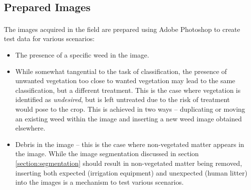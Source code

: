 \documentclass[letterpaper]{article}
\begin{document}
\subsection{Prepared Images}
The images acquired in the field are prepared using Adobe Photoshop\textsuperscript{\textregistered} to create test data for various scenarios:
\begin{itemize}
	\item{The presence of a specific weed in the image.}
	\item{While somewhat tangential to the task of classification, the presence of unwanted vegetation too close to wanted vegetation may lead to the same classification, but a different treatment. This is the case where vegetation is identified as \textit{undesired}, but is left untreated due to the risk of treatment would pose to the crop.} This is achieved in two ways -- duplicating or moving an existing weed within the image and inserting a new weed image obtained elsewhere.
	\item{Debris in the image -- this is the case where non-vegetated matter appears in the image. While the image segmentation discussed in section \ref{section:segmentation} should result in non-vegetated matter being removed, inserting both expected (irrigation equipment) and unexpected (human litter) into the images is a mechanism to test various scenarios.}
\end{itemize}
\end{document}
